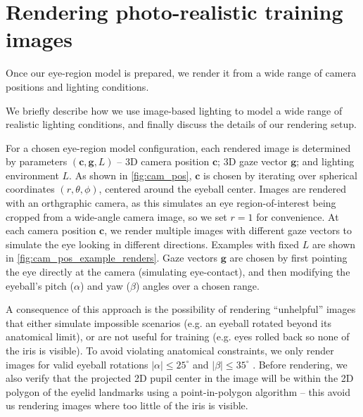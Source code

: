 
\section{Rendering photo-realistic training images}

Once our eye-region model is prepared, we render it from a wide range of camera positions and lighting conditions.

We briefly describe how we use image-based lighting \cite{debevec2002image} to model a wide range of realistic lighting conditions, and finally discuss the details of our rendering setup.

For a chosen eye-region model configuration, each rendered image is determined by parameters $(\mathbf{c}, \mathbf{g}, L)$ -- 3D camera position $\mathbf{c}$; 3D gaze vector $\mathbf{g}$; and lighting environment $L$. As shown in \autoref{fig:cam_pos}, $\mathbf{c}$ is chosen by iterating over spherical coordinates $(r, \theta, \phi)$, centered around the eyeball center. Images are rendered with an orthgraphic camera, as this simulates an eye region-of-interest being cropped from a wide-angle camera image, so we set $r\!=\!1$ for convenience. At each camera position $\mathbf{c}$, we render multiple images with different gaze vectors to simulate the eye looking in different directions. Examples with fixed $L$ are shown in \autoref{fig:cam_pos_example_renders}. Gaze vectors $\mathbf{g}$ are chosen by first pointing the eye directly at the camera (simulating eye-contact), and then modifying the eyeball's pitch ($\alpha$) and yaw ($\beta$) angles over a chosen range.

A consequence of this approach is the possibility of rendering ``unhelpful'' images that either simulate impossible scenarios (e.g. an eyeball rotated beyond its anatomical limit), or are not useful for training (e.g. eyes rolled back so none of the iris is visible). To avoid violating anatomical constraints, we only render images for valid eyeball rotations $|\alpha|\!\leq\!25^{\circ}$ and $|\beta|\!\leq\!35^{\circ}$ \cite{MIL-STD-1472G}. Before rendering, we also verify that the projected 2D pupil center in the image will be within the 2D polygon of the eyelid landmarks using a point-in-polygon algorithm -- this avoid us rendering images where too little of the iris is visible.

